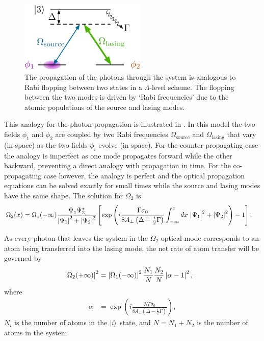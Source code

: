 \begin{figure}
    \centering
    \includegraphics[width=6cm]{DualModel}
    \caption{The propagation of the photons through the system is analogous to Rabi flopping between two states in a $\Lambda$-level scheme.  The flopping between the two modes is driven by `Rabi frequencies' due to the atomic populations of the source and lasing modes.}
    \label{OpticalPumping:DualModel}
\end{figure}

This analogy for the photon propagation is illustrated in .  In this model the two fields $\phi_1$ and $\phi_2$ are coupled by two Rabi frequencies $\Omega_\text{source}$ and $\Omega_\text{lasing}$ that vary (in space) as the two fields $\phi_i$ evolve (in space).  For the counter-propagating case the analogy is imperfect as one mode propagates forward while the other backward, preventing a direct analogy with propagation in time.  For the co-propagating case however, the analogy is perfect and the optical propagation equations can be solved exactly for small times while the source and lasing modes have the same shape.  The solution for $\Omega_2$ is
\begin{align}
    \Omega_2(x) &= \Omega_1(-\infty) \frac{\Psi_1^{\phantom{*}} \Psi_2^*}{\left|\Psi_1\right|^2 + \left|\Psi_2\right|^2} \left[\exp \left( i \frac{\Gamma \sigma_0}{8 A_\perp\left(\Delta - \frac{i}{2} \Gamma\right)}\int_{-\infty}^x dx\, \left|\Psi_1\right|^2 + \left|\Psi_2\right|^2\right) -1 \right].
\end{align}

As every photon that leaves the system in the $\Omega_2$ optical mode corresponds to an atom being transferred into the lasing mode, the net rate of atom transfer will be governed by
\begin{align}
    \abs{\Omega_2(+\infty)}^2 &= \abs{\Omega_1(-\infty)}^2 \frac{N_1}{N} \frac{N_2}{N} \abs{\alpha - 1}^2, \label{OpticalPumping:OverlappingCondensates:Omega2Infinity}
\end{align}
where
\begin{align}
    \alpha &= \exp \left( i \frac{N\Gamma \sigma_0}{8 A_\perp\left(\Delta - \frac{i}{2} \Gamma\right)}\right),
\end{align}
$N_i$ is the number of atoms in the ${\left|i\right>}$ state, and $N = N_1 + N_2$ is the number of atoms in the system.  

